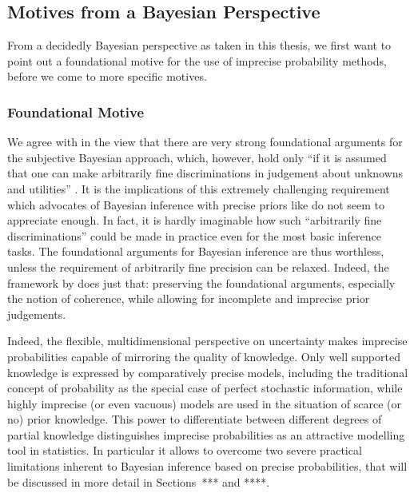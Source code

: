 \subsection{Motives from a Bayesian Perspective}
\label{sec:motivation:bayesian}

From a decidedly Bayesian perspective as taken in this thesis,
we first want to point out a foundational motive for the use of imprecise probability methods,
before we come to more specific motives.

\subsubsection{Foundational Motive}

We agree with \textcite[\S 1.1]{1994:berger} in the view that there are very strong foundational arguments
for the subjective Bayesian approach, which, however, hold only
``if it is assumed that one can make arbitrarily fine discriminations
in judgement about unknowns and utilities'' \parencite[p.~303]{1994:berger}. 
It is the implications of this extremely challenging requirement
which advocates of Bayesian inference with precise priors
like \textcite{1987:lindley} do not seem to appreciate enough.
In fact, it is hardly imaginable how such ``arbitrarily fine discriminations''
could be made in practice even for the most basic inference tasks.
The foundational arguments for Bayesian inference are thus worthless,
unless the requirement of arbitrarily fine precision can be relaxed.
Indeed, the framework by \textcite{1991:walley} does just that:
preserving the foundational arguments, especially the notion of coherence,
while allowing for incomplete and imprecise prior judgements.

Indeed,
the flexible, multidimensional perspective on uncertainty makes imprecise probabilities capable of mirroring the quality of knowledge.
Only well supported knowledge is expressed by comparatively precise models,
including the traditional concept of probability as the special case of perfect stochastic information,
while highly imprecise (or even vacuous) models are used in the situation of scarce (or no) prior knowledge.
This power to differentiate between different degrees of partial knowledge
distinguishes imprecise probabilities as an attractive modelling tool in statistics.
In particular it allows to overcome two severe practical limitations inherent to Bayesian inference based on precise probabilities,
that will be discussed in more detail in Sections~*** and ****.

